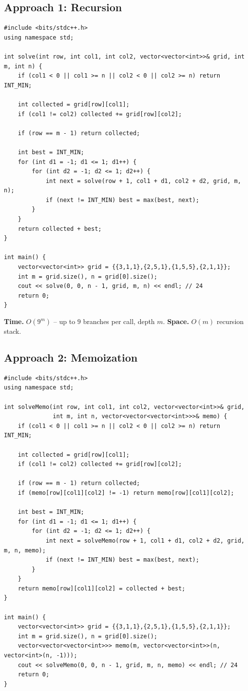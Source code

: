 \subsection*{Approach 1: Recursion}

\begin{lstlisting}
#include <bits/stdc++.h>
using namespace std;

int solve(int row, int col1, int col2, vector<vector<int>>& grid, int m, int n) {
    if (col1 < 0 || col1 >= n || col2 < 0 || col2 >= n) return INT_MIN;

    int collected = grid[row][col1];
    if (col1 != col2) collected += grid[row][col2];

    if (row == m - 1) return collected;

    int best = INT_MIN;
    for (int d1 = -1; d1 <= 1; d1++) {
        for (int d2 = -1; d2 <= 1; d2++) {
            int next = solve(row + 1, col1 + d1, col2 + d2, grid, m, n);
            if (next != INT_MIN) best = max(best, next);
        }
    }
    return collected + best;
}

int main() {
    vector<vector<int>> grid = {{3,1,1},{2,5,1},{1,5,5},{2,1,1}};
    int m = grid.size(), n = grid[0].size();
    cout << solve(0, 0, n - 1, grid, m, n) << endl; // 24
    return 0;
}
\end{lstlisting}

\begin{complexitybox}
\textbf{Time.} $O(9^m)$ -- up to $9$ branches per call, depth $m$.
\textbf{Space.} $O(m)$ recursion stack.
\end{complexitybox}

\subsection*{Approach 2: Memoization}

\begin{lstlisting}
#include <bits/stdc++.h>
using namespace std;

int solveMemo(int row, int col1, int col2, vector<vector<int>>& grid,
              int m, int n, vector<vector<vector<int>>>& memo) {
    if (col1 < 0 || col1 >= n || col2 < 0 || col2 >= n) return INT_MIN;

    int collected = grid[row][col1];
    if (col1 != col2) collected += grid[row][col2];

    if (row == m - 1) return collected;
    if (memo[row][col1][col2] != -1) return memo[row][col1][col2];

    int best = INT_MIN;
    for (int d1 = -1; d1 <= 1; d1++) {
        for (int d2 = -1; d2 <= 1; d2++) {
            int next = solveMemo(row + 1, col1 + d1, col2 + d2, grid, m, n, memo);
            if (next != INT_MIN) best = max(best, next);
        }
    }
    return memo[row][col1][col2] = collected + best;
}

int main() {
    vector<vector<int>> grid = {{3,1,1},{2,5,1},{1,5,5},{2,1,1}};
    int m = grid.size(), n = grid[0].size();
    vector<vector<vector<int>>> memo(m, vector<vector<int>>(n, vector<int>(n, -1)));
    cout << solveMemo(0, 0, n - 1, grid, m, n, memo) << endl; // 24
    return 0;
}
\end{lstlisting}


